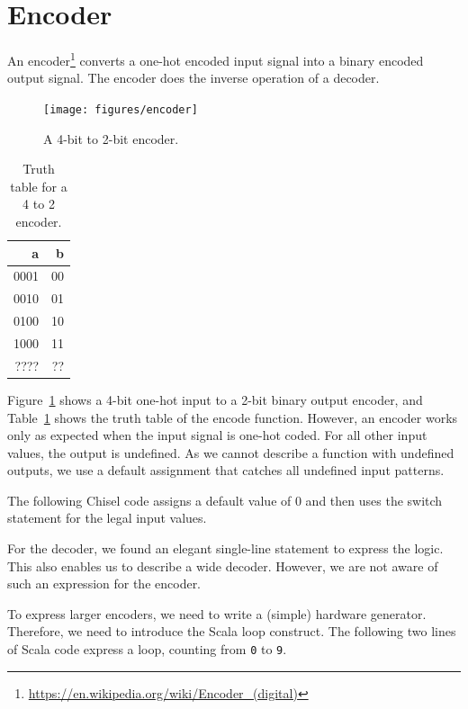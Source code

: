 \documentclass[%
    10pt,
    headinclude, footexclude,
    openright, %
    notitlepage,
    cleardoubleempty,
    headsepline,
    pointlessnumbers,
    bibtotoc, idxtotoc,
    ]{scrbook}
\newcommand{\code}[1]{{\small{\texttt{#1}}}}
\newcommand{\myref}[2]{\href{#1}{#2}}
\renewcommand{\myref}[2]{{#2}{\footnote{\url{#1}}}}
\begin{document}
\section{Encoder}

An \myref{https://en.wikipedia.org/wiki/Encoder_(digital)}{encoder}
converts a one-hot encoded input signal into a binary encoded output signal.
The encoder does the inverse operation of a decoder.

\begin{figure}
  \centering
  \texttt{[image: figures/encoder]}
  \caption{A 4-bit to 2-bit encoder.}
  \label{fig:encoder}
\end{figure}


\begin{table}
 \centering
  \begin{tabular}{rr}
    \toprule
    a & b \\
    \midrule
    0001 & 00 \\
    0010 & 01 \\
    0100 & 10 \\
    1000 & 11 \\
    ???? & ?? \\
    \bottomrule
  \end{tabular}
  \caption{Truth table for a 4 to 2 encoder.}
 \label{tab:encoder}
\end{table}

Figure~\ref{fig:encoder} shows a 4-bit one-hot input to a 2-bit binary output encoder, and
Table~\ref{tab:encoder} shows the truth table of the encode function. However, an encoder
works only as expected when the input signal is one-hot coded. For all other input values, the output
is undefined. As we cannot describe a function with undefined outputs, we use a default
assignment that catches all undefined input patterns.

The following Chisel code assigns a default value of 0 and then uses the switch statement
for the legal input values.


For the decoder, we found an elegant single-line statement to express the logic.
This also enables us to describe a wide decoder. However, we are not aware
of such an expression for the encoder.

To express larger encoders, we need to write a (simple) hardware generator.
Therefore, we need to introduce the Scala loop construct. The following two lines
of Scala code express a loop, counting from \code{0} to \code{9}.
\end{document}
